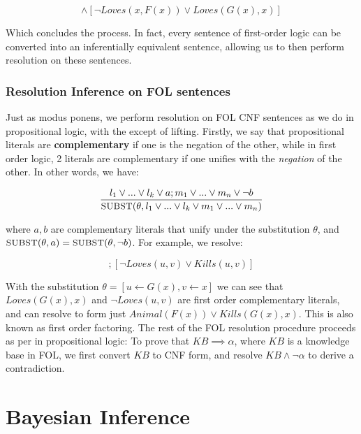 \documentclass[12pt]{article}
\begin{document}
 \begin{equation*}
[Animal(F(x)) \land Loves(G(x), x)] \land [\lnot Loves(x, F(x)) \lor Loves(G(x), x)]
\end{equation*}

Which concludes the process. In fact, every sentence of first-order logic can be converted into an inferentially equivalent sentence, allowing us to then perform resolution on these sentences.

\subsubsection{Resolution Inference on FOL sentences}

Just as modus ponens, we perform resolution on FOL CNF sentences as we do in propositional logic, with the except of lifting. Firstly, we say that propositional literals are \textbf{complementary} if one is the negation of the other, while in first order logic, 2 literals are complementary if one unifies with the \textit{negation} of the other. In other words, we have:

\begin{equation*}
\frac{l_1 \lor ... \lor l_k \lor a; m_1 \lor ... \lor m_n \lor \lnot b}{\textsc{\small{SUBST}}(\theta, l_1 \lor ... \lor l_k \lor m_1 \lor ... \lor m_n)}
\end{equation*}

where $a, b$ are complementary literals that unify under the substitution $\theta$, and $\textsc{\small{SUBST}}(\theta, a) = \textsc{\small{SUBST}}(\theta, \lnot b)$. For example, we resolve:

\begin{equation*}
[Animal(F(x)) \land Loves(G(x), x)] ; [\lnot Loves(u, v) \lor Kills(u, v)]
\end{equation*}

With the substitution $\theta = [u \leftarrow G(x), v \leftarrow x]$ we can see that $Loves(G(x), x)$ and $\lnot Loves(u, v)$ are first order complementary literals, and can resolve to form just $Animal(F(x)) \lor Kills(G(x), x)$. This is also known as first order factoring. The rest of the FOL resolution procedure proceeds as per in propositional logic: To prove that $KB \implies \alpha$, where $KB$ is a knowledge base in FOL, we first convert $KB$ to CNF form, and resolve $KB \land \lnot \alpha$ to derive a contradiction.

\pagebreak
\section{Bayesian Inference}
\end{document}
